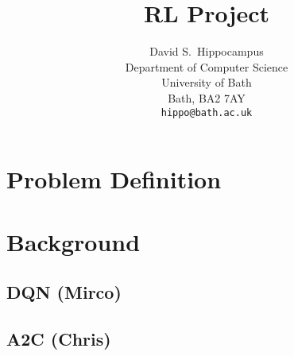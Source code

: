 \documentclass{article}
\title{RL Project}
\author{
  David S.~Hippocampus
  \\
  Department of Computer Science\\
  University of Bath\\
  Bath, BA2 7AY \\
  \texttt{hippo@bath.ac.uk} \\
}
\begin{document}
\maketitle

\section{Problem Definition}


\section{Background}


\subsection{DQN (Mirco)}



\subsection{A2C (Chris)}
\end{document}
